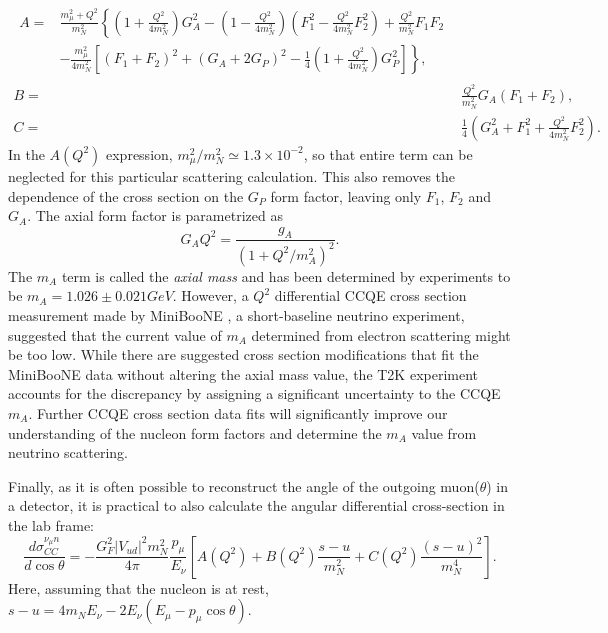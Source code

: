 \begin{align}
\begin{split}
A = { }& \frac{m_\mu^2+Q^2}{m_N^2}\left\{\left( 1+\frac{Q^2}{4m_N^2}\right) G_A^2 - \left(1-\frac{Q^2}{4m_N^2}\right)\left(F_1^2-\frac{Q^2}{4m_N^2}F^2_2\right) + \frac{Q^2}{m_N^2}F_1 F_2\right. \nonumber\\
 &\left. - \frac{m_\mu^2}{4m_N^2}\left[(F_1+F_2)^2+(G_A+2G_P)^2 - \frac{1}{4}\left(1+\frac{Q^2}{4m_N^2}\right)G_P^2\right]\right\} ,
\end{split}\\
B = { }& \frac{Q^2}{m_N^2}G_A(F_1+F_2),\nonumber\\
C = { }& \frac{1}{4}\left(G_A^2+F_1^2+\frac{Q^2}{4m_N^2}F_2^2\right) .\nonumber
\end{align}
In the $A(Q^2)$ expression, $m_\mu^2 / m_N^2 \simeq 1.3\times10^{-2}$, so that entire term can be neglected for this particular scattering calculation. This also removes the dependence of the cross section on the $G_P$ form factor, leaving only $F_1$, $F_2$ and $G_A$. The axial form factor is parametrized as
\begin{equation}
G_A{Q^2} = \frac{g_A}{(1+Q^2/m_A^2)^2}.
\end{equation}
The $m_A$ term is called the \emph{axial mass} and has been determined by experiments to be $m_A = 1.026 \pm 0.021 GeV$. However, a $Q^2$ differential CCQE cross section measurement made by MiniBooNE \cite{MBCCQE}, a short-baseline neutrino experiment, suggested that the current value of $m_A$ determined from electron scattering might be too low. While there are suggested cross section modifications that fit the MiniBooNE data without altering the axial mass value, the T2K experiment accounts for the discrepancy by assigning a significant uncertainty to the CCQE $m_A$. Further CCQE cross section data fits will significantly improve our understanding of the nucleon form factors and determine the $m_A$ value from neutrino scattering.

Finally, as it is often possible to reconstruct the angle of the outgoing muon($\theta$) in a detector, it is practical to also calculate the angular differential cross-section in the lab frame:
\begin{equation}
\frac{d\sigma^{\nu_\mu n}_{CC}}{d\cos\theta} = -\frac{G_F^2 |V_{ud}|^2 m_N^2}{4\pi} \frac{p_\mu}{E_\nu}\left[ A(Q^2) + B(Q^2)\frac{s-u}{m_N^2} + C(Q^2)\frac{(s-u)^2}{m_N^4}\right].
\end{equation}
Here, assuming that the nucleon is at rest, $s-u = 4m_N E_\nu - 2 E_\nu (E_\mu - p_\mu \cos\theta)$. 

